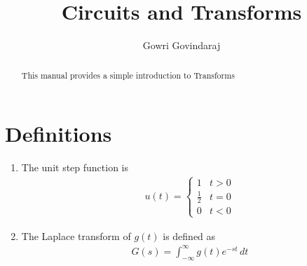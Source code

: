 \documentclass[journal,12pt,twocolumn]{IEEEtran}
\renewcommand\thesection{\arabic{section}}
\begin{document}
\let\StandardTheFigure\thefigure
\renewcommand{\thefigure}{\theproblem}
\renewcommand{\thefigure}{\arabic{section}.\arabic{figure}}
\makeatletter
{}
\makeatother


\def\putbox#1#2#3{\makebox[0in][l]{\makebox[#1][l]{}\raisebox{\baselineskip}[0in][0in]{\raisebox{#2}[0in][0in]{#3}}}}
     \def\rightbox#1{\makebox[0in][r]{#1}}
     \def\centbox#1{\makebox[0in]{#1}}
     \def\topbox#1{\raisebox{-\baselineskip}[0in][0in]{#1}}
     \def\midbox#1{\raisebox{-0.5\baselineskip}[0in][0in]{#1}}

\vspace{3cm}

\title{ 
Circuits and Transforms
}

\author{Gowri Govindaraj}

\maketitle


\tableofcontents


\renewcommand{\thefigure}{\theenumi}
\renewcommand{\thetable}{\theenumi}



\bigskip

\begin{abstract}
This manual provides a simple introduction to Transforms
\end{abstract}

\section{Definitions}
\begin{enumerate}[label=\arabic*.,ref=\thesection.\theenumi]
\item The unit step function is 
\begin{align}
u(t) =
\begin{cases}
1 & t > 0
\\
	\frac{1}{2} & t = 0
\\
0 & t < 0
\end{cases}
\end{align}
\item The Laplace transform of $g(t)$ is defined as 
\begin{align}
	G(s) = \int_{-\infty}^{\infty} g(t) e^{-st}\, dt
\end{align}
 \end{enumerate}
\end{document}
